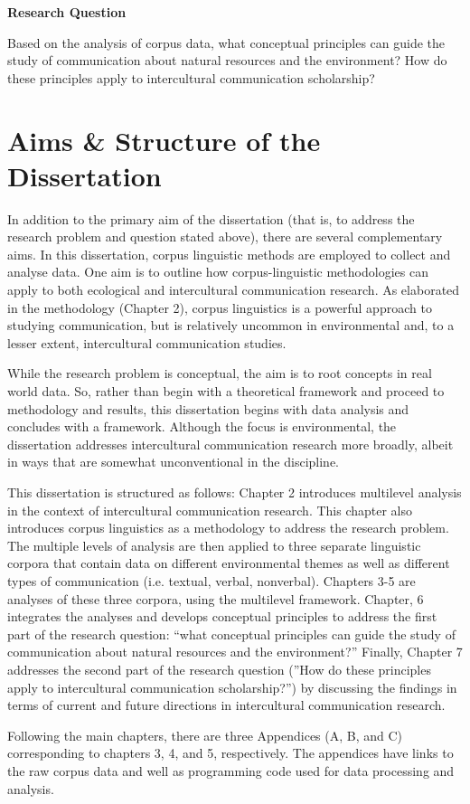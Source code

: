\textbf{Research Question}

Based on the analysis of corpus data, what conceptual principles can guide the study of communication about natural resources and the environment? How do these principles apply to intercultural communication scholarship?

\section{Aims \& Structure of the Dissertation}

In addition to the primary aim of the dissertation (that is, to address the research problem and question stated above), there are several complementary aims. In this dissertation, corpus linguistic methods are employed to collect and analyse data. One aim is to outline how corpus-linguistic methodologies can apply to both ecological and intercultural communication research. As elaborated in the methodology (Chapter 2), corpus linguistics is a powerful approach to studying communication, but is relatively uncommon in environmental and, to a lesser extent, intercultural communication studies. 

While the research problem is conceptual, the aim is to root concepts in real world data. So, rather than begin with a theoretical framework and proceed to methodology and results, this dissertation begins with data analysis and concludes with a framework. Although the focus is environmental, the dissertation addresses intercultural communication research more broadly, albeit in ways that are somewhat unconventional in the discipline.     

This dissertation is structured as follows: Chapter 2 introduces multilevel analysis in the context of intercultural communication research. This chapter also introduces corpus linguistics as a methodology to address the research problem. The multiple levels of analysis are then applied to three separate linguistic corpora that contain data on different environmental themes as well as different types of communication (i.e. textual, verbal, nonverbal). Chapters 3-5 are analyses of these three corpora, using the multilevel framework. Chapter, 6 integrates the analyses and develops conceptual principles to address the first part of the research question: ``what conceptual principles can guide the study of communication about natural resources and the environment?'' Finally, Chapter 7 addresses the second part of the research question (''How do these principles apply to intercultural communication scholarship?'') by discussing the findings in terms of current and future directions in intercultural communication research. 

Following the main chapters, there are three Appendices (A, B, and C) corresponding to chapters 3, 4, and 5, respectively. The appendices have links to the raw corpus data and well as programming code used for data processing and analysis.